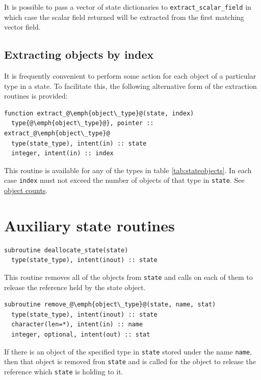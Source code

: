 \documentclass[a4paper, 11pt]{book}
\begin{document}
It is possible to pass a vector of state dictionaries to
\lstinline+extract_scalar_field+ in which case the scalar field returned
will be extracted from the first matching vector field.

\subsection{Extracting objects by index}

It is frequently convenient to perform some action for each object of a
particular type in a state. To facilitate this, the following alternative
form of the extraction routines is provided:

\begin{lstlisting}
function extract_@\emph{object\_type}@(state, index)
  type{@\emph{object\_type}@}, pointer :: extract_@\emph{object\_type}@ 
  type(state_type), intent(in) :: state
  integer, intent(in) :: index
\end{lstlisting}

This routine is available for any of the types in table
\ref{tab:stateobjects}. In each case \lstinline+index+ must not exceed the
number of objects of that type in \lstinline+state+. See 
\hyperlink{proc:objectcounts}{object counts}.


\section{Auxiliary state routines}


\begin{lstlisting}
subroutine deallocate_state(state)
  type(state_type), intent(inout) :: state
\end{lstlisting}

This routine removes all of the objects from \lstinline+state+ and calls
\deallocate on each of them to release the reference held by the state
object.


\begin{lstlisting}
subroutine remove_@\emph{object\_type}@(state, name, stat)
  type(state_type), intent(inout) :: state
  character(len=*), intent(in) :: name
  integer, optional, intent(out) :: stat
\end{lstlisting}

If there is an object of the specified type in \lstinline+state+ stored
under the name \lstinline+name+, then that object is removed fron
\lstinline+state+ and \deallocate is called for the object to release the
reference which \lstinline+state+ is holding to it.
\end{document}
